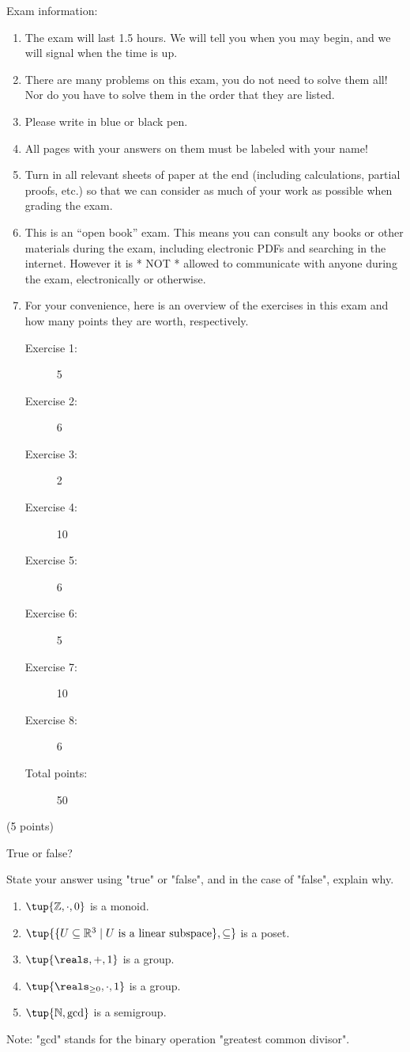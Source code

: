\documentclass[paper=8.125in:10.250in,pagesize=pdftex,
    headinclude=false,footinclude=false,oneside,egregdoesnotlikesansseriftitles]{kaobook}
\begin{document}
Exam information: 
\begin{enumerate}
\item The exam will last 1.5 hours. We will tell you when you may begin, and we will signal when the time is up. 
\item There are many problems on this exam, you do not need to solve them all! Nor do you have to solve them in the order that they are listed. 
\item Please write in blue or black pen. 
\item All pages with your answers on them must be labeled with your name!
\item Turn in all relevant sheets of paper at the end (including calculations, partial proofs, etc.) so that we can consider as much of your work as possible when grading the exam. 
\item This is an ``open book'' exam. This means you can consult any books or other materials during the exam, including electronic PDFs and searching in the internet. However it is * NOT * allowed to communicate with anyone during the exam, electronically or otherwise. 
\item For your convenience, here is an overview of the exercises in this exam and how many points they are worth, respectively. 
\begin{description}
\item[Exercise 1:] 5
\item[Exercise 2:] 6
\item[Exercise 3:] 2
\item[Exercise 4:] 10
\item[Exercise 5:] 6
\item[Exercise 6:] 5
\item[Exercise 7:] 10
\item[Exercise 8:] 6
\item[Total points:] 50
\end{description}
\end{enumerate}

\newpage



\begin{gradedexercise}\label{ex:AlgebraicGadgets}
(5 points) 
\

True or false? 

State your answer using "true" or "false", and in the case of "false", explain why. 
\begin{enumerate}
\item $\tup{\mathbb{Z}, \cdot, 0}$ is a monoid. 
\item $\tup{\{ U \subseteq \mathbb{R}^3 \mid U \text{ is a linear subspace} \}, \subseteq}$ is a poset. 
\item $\tup{\reals, +, 1}$ is a group.
\item $\tup{\reals_{\geq 0}, \cdot, 1}$ is a group. 
\item $\tup{\mathbb{N}, \text{gcd}}$ is a semigroup.
\end{enumerate}
Note: "gcd" stands for the binary operation "greatest common divisor". 
\end{gradedexercise}
\end{document}
